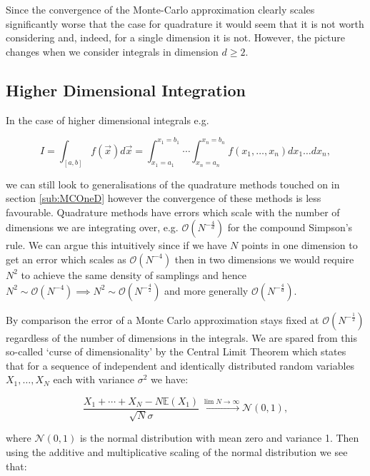 	Since the convergence of the Monte-Carlo approximation clearly scales significantly worse that the case for quadrature it would seem
	that it is not worth considering and, indeed, for a single dimension it is not. However, the picture changes when we consider
	integrals in dimension $d\geq2$.

	\subsection{Higher Dimensional Integration}
	\label{sub:MCND}

	In the case of higher dimensional integrals e.g.

	\begin{equation}
		I = \int_{[a, b]}f(\vec{x})d\vec{x} = \int_{x_1=a_1}^{x_1=b_1}\cdots\int_{x_n=a_n}^{x_n=b_n}f(x_1, \ldots, x_n)dx_1\ldots dx_n,
	\end{equation}

	we can still look to generalisations of the quadrature methods touched on in section \ref{sub:MCOneD} however the convergence of
	these methods is less favourable.  Quadrature methods have errors which scale with the number of dimensions we are integrating over,
	e.g. $\mathcal{O}(N^{-\frac{4}{d}})$ for the compound Simpson's rule.  We can argue this intuitively since if we have $N$ points in one
	dimension to get an error which scales as $\mathcal{O}(N^{-4})$ then in two dimensions we would require $N^2$ to achieve
	the same density of samplings and hence $N^2\sim\mathcal{O}(N^{-4})\implies N^2\sim\mathcal{O}(N^{-\frac{4}{2}})$ and more generally
	$\mathcal{O}(N^{-\frac{4}{d}})$.

	By comparison the error of a Monte Carlo approximation stays fixed at $\mathcal{O}(N^{-\frac{1}{2}})$ regardless of the number of
	dimensions in the integrals.  We are spared from this so-called `curse of dimensionality' by the Central Limit Theorem
	which states that for a sequence of independent and identically distributed random variables $X_1, \ldots, X_N$ each with
	variance $\sigma^2$ we have:

	\begin{equation}
		\frac{X_1 + \cdots + X_N - N\mathbb{E}(X_1)}{\sqrt{N}\sigma}\xrightarrow{\lim{N\rightarrow\infty}}\mathcal{N}(0, 1),
	\end{equation}

	\noindent where $\mathcal{N}(0, 1)$ is the normal distribution with mean zero and variance 1.  Then using the additive and multiplicative scaling
	of the normal distribution we see that:

